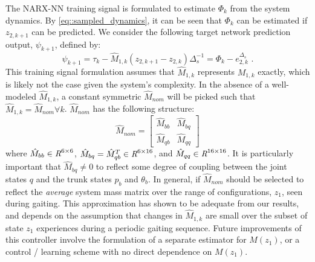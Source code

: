 			The  NARX-NN training signal is formulated to estimate $\Phi_{k}$ from the system dynamics. By \ref{eq::sampled_dynamics}, it can be seen that $\Phi_{k}$ can be estimated if ${z}_{2,k+1}$ can be predicted. We consider the following target network prediction output, $\psi_{k+1}$,  defined by:
				\begin{equation}
					\psi_{k+1} = \tau_{k} - \hat{M}_{1,k}({z}_{2,k+1} - {z}_{2,k})\Delta_{s}^{-1} = \Phi_{k} - {e}_{2,k}^{\Delta_{s}} \text{ .}
					\label{eq::training_signal}
				\end{equation}
			This training signal formulation assumes that $\hat{M}_{1,k}$ represents $M_{1,k}$ exactly, which is likely not the case given the system's complexity. In the absence of a well-modeled $\hat{M}_{1,k}$, a constant symmetric $\hat{M}_{nom}$ will be picked such that $\hat{M}_{1,k} = \hat{M}_{nom} \forall k$. $\hat{M}_{nom}$ has the following structure:
				\begin{equation}
					\hat{M}_{nom} = \left[
						\begin{array}{cc}
						\hat{M}_{bb}	&	 \hat{M}_{bq}\\
						\hat{M}_{qb}	&	 \hat{M}_{qq}
						\end{array}
					\right]
				\end{equation}
			where 	$\hat{M}_{bb}\in \emph{R}^{6\times6}$, 
					$\hat{M}_{bq}=\hat{M}_{qb}^{T} \in \emph{R}^{6\times16}$, and  
					$\hat{M}_{qq}\in \emph{R}^{16\times16}$. 
			It is particularly important that $\hat{M}_{bq}\neq0$ to reflect some degree of coupling between the joint states $q$ and the trunk states ${p}_{b}$ and $\theta_{b}$. In general, if $\hat{M}_{nom}$ should be selected to reflect the \emph{average} system mass matrix over the range of configurations, $z_{1}$, seen during gaiting. This approximation has shown to be adequate from our results, and depends on the assumption that changes in $\hat{M}_{1,k}$ are small  over the subset of state $z_{1}$ experiences during a periodic gaiting sequence. Future improvements of this controller involve the formulation of a separate estimator for $M(z_{1})$, or a control / learning scheme with no direct dependence on $M(z_{1})$.

